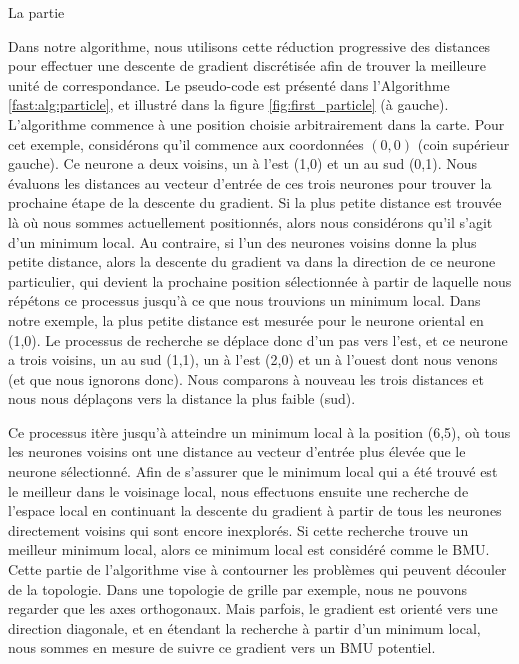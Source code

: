 	La partie 


	Dans notre algorithme, nous utilisons cette réduction progressive des distances pour effectuer une descente de gradient discrétisée afin de trouver la meilleure unité de correspondance. Le pseudo-code est présenté dans l'Algorithme \ref{fast:alg:particle}, et illustré dans la figure \ref{fig:first_particle} (à gauche). L'algorithme commence à une position choisie arbitrairement dans la carte. Pour cet exemple, considérons qu'il commence aux coordonnées $(0,0)$ (coin supérieur gauche). Ce neurone a deux voisins, un à l'est (1,0) et un au sud (0,1). Nous évaluons les distances au vecteur d'entrée de ces trois neurones pour trouver la prochaine étape de la descente du gradient. Si la plus petite distance est trouvée là où nous sommes actuellement positionnés, alors nous considérons qu'il s'agit d'un minimum local. Au contraire, si l'un des neurones voisins donne la plus petite distance, alors la descente du gradient va dans la direction de ce neurone particulier, qui devient la prochaine position sélectionnée à partir de laquelle nous répétons ce processus jusqu'à ce que nous trouvions un minimum local. Dans notre exemple, la plus petite distance est mesurée pour le neurone oriental en (1,0). Le processus de recherche se déplace donc d'un pas vers l'est, et ce neurone a trois voisins, un au sud (1,1), un à l'est (2,0) et un à l'ouest dont nous venons (et que nous ignorons donc). Nous comparons à nouveau les trois distances et nous nous déplaçons vers la distance la plus faible (sud).

	Ce processus itère jusqu'à atteindre un minimum local à la position (6,5), où tous les neurones voisins ont une distance au vecteur d'entrée plus élevée que le neurone sélectionné. Afin de s'assurer que le minimum local qui a été trouvé est le meilleur dans le voisinage local, nous effectuons ensuite une recherche de l'espace local en continuant la descente du gradient à partir de tous les neurones directement voisins qui sont encore inexplorés. Si cette recherche trouve un meilleur minimum local, alors ce minimum local est considéré comme le BMU. Cette partie de l'algorithme vise à contourner les problèmes qui peuvent découler de la topologie. Dans une topologie de grille par exemple, nous ne pouvons regarder que les axes orthogonaux. Mais parfois, le gradient est orienté vers une direction diagonale, et en étendant la recherche à partir d'un minimum local, nous sommes en mesure de suivre ce gradient vers un BMU potentiel.


